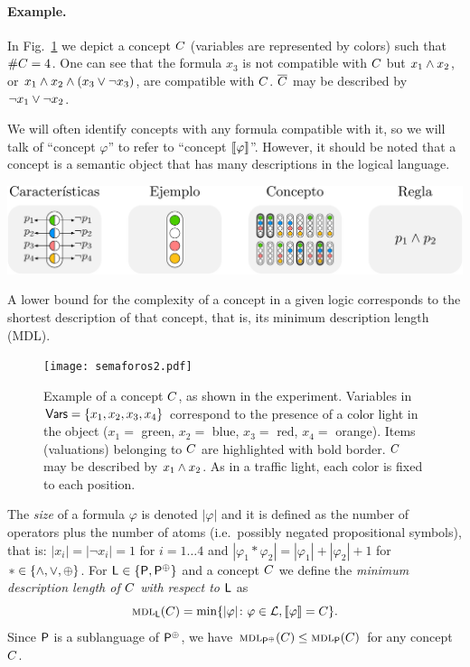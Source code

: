 \paragraph*{Example.}
In Fig.~\ref{semaforos} we depict a concept $C$ (variables are represented by colors) such that $\#C=4$. One can see that the formula $x_3$ is not compatible with $C$ but $x_1 \wedge x_2$, or $x_1 \wedge x_2 \wedge (x_3 \vee \lnot x_3)$, are compatible with $C$. $\overline {C}$ may be described by $\lnot x_1\vee \lnot x_2$.

We will often identify concepts with any formula compatible with it, so we will talk of ``concept $\varphi$'' to refer to ``concept $\llbracket \varphi\rrbracket$''. However, it should be noted that a concept is a semantic object that has many descriptions in the logical language.

\includegraphics[scale=.6]{../figuras/pre/notacion.pdf}

A lower bound for the complexity of a concept in a given logic corresponds to the shortest description of that concept, that is, its minimum description length (MDL).

 \begin{figure}[t!]
 \vspace{-0.5cm}
  \centering
  \texttt{[image: semaforos2.pdf]}
  \caption{Example of a concept $C$, as shown in the experiment. Variables in ${\sf Vars}=\{x_1,x_2,x_3,x_4\}$ correspond to the presence of a  color light in the object ($x_{1}=$ green, $x_2=$ blue, $x_3=$ red, $x_4=$ orange). Items (valuations) belonging to $C$ are highlighted with bold border. $C$ may be described by $x_1\wedge x_2$. As in a traffic light, each color is fixed to each position.}
  \label{semaforos}
\end{figure}
   
The {\em size} of a formula $\varphi$ is denoted $|\varphi|$ and it is defined as the number of operators plus the number of atoms (i.e.\ possibly negated propositional symbols), that is: $|x_i|=|\lnot x_i|=1$ for $i=1\dots 4$ and $|\varphi_1*\varphi_2|=|\varphi_1|+|\varphi_2|+1$ for $*\in\{\wedge,\vee,\oplus\}$. For ${\sf L} \in\{{\sf P},{\sf P}^\oplus\}$ and a concept $C$ we define the {\em minimum description length of $C$ with respect to $\mathcal {\sf L}$} as
$$
\textsc{mdl}_{\sf L}(C)=\min\{|\varphi|\colon \varphi\in\mathcal L, \llbracket \varphi\rrbracket=C\}.
$$
Since ${\sf P}$ is a sublanguage of ${\sf P}^\oplus$, we have $\textsc{mdl}_{{\sf P}^\oplus}(C)\leq\textsc{mdl}_{{\sf P}}(C)$ for any concept $C$.
   
